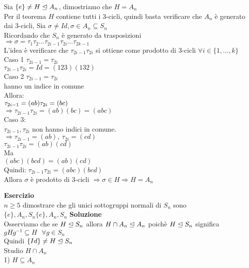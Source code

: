 \documentclass[12px]{article}
\begin{document}
	\begin{dimo}
		Sia $\{e\}\neq H\trianglelefteq A_n$, dimostriamo che $H=A_n$\\
		Per il teorema  $H$ contiene tutti i $3$-cicli, quindi basta verificare che $A_n$ è generato dai  $3$-cicli, Sia $\sigma\neq Id, \sigma\in A_n\subseteq S_n$\\
Ricordando che  $S_n$ è generato da trasposizioni\\
$ \Rightarrow \sigma = \tau_1\tau_2\ldots\tau_{2i-1}\tau_{2i}\ldots\tau_{2k-1}$ \\
L'idea è verificare che $\tau_{2i-1}\tau_{2i}$ si ottiene come prodotto di  $3$-cicli $\forall i\in \{1,\ldots,k\}$\\
Caso 1  $\tau_{2i-1} = \tau_{2i}$\\
$\tau_{2i-1}\tau_{2i} = Id = (123)(132)$\\
Caso 2  $\tau_{2i-1}=\tau_{2i}$\\
hanno un indice in comune\\
Allora:\\
$\tau_{2i-1} = (ab)\\
\tau_{2i} = (bc)$\\
$ \Rightarrow \tau_{2i-1}\tau_{2i} = (ab)(bc) = (abc)$ \\
Caso 3:\\ $\tau_{2i-1},\tau_{2i}$ non hanno indici in comune.\\
$ \Rightarrow \tau_{2i-1} = (ab), \ \tau_{2i} = (cd)$ \\
$\tau_{2i-1}\tau_{2i} = (ab)(cd)$\\
Ma \\
$(abc)(bcd) = (ab)(cd)$\\
Quindi:
$\tau_{2i-1}\tau_{2i} = (abc)(bcd)$\\
Allora  $\sigma$ è prodotto di $3$-cicli $ \Rightarrow \sigma \in H \Rightarrow H = A_n$
	\end{dimo}
	\textbf{Esercizio}\\
	$n\geq 5$ dimostrare che gli unici sottogruppi normali di $S_n$ sono $\{e\}, A_n, S_n\{e\}, A_n, S_n$
	\textbf{Soluzione}\\
	Osserviamo che se $ H\trianglelefteq S_n$ allora  $H\cap A_n\trianglelefteq A_n$ poichè  $H\trianglelefteq S_n$ significa \\
	$gHg^{-1}\subseteq H \ \ \ \forall g\in S_n$\\
	Quindi  $\{Id\}\neq H\trianglelefteq S_n$\\
	Studio  $H\cap A_n$\\
	1)  $H\subseteq A_n$\\
\end{document}
